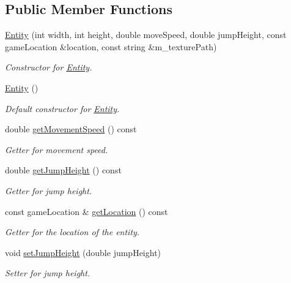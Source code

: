 \subsection*{Public Member Functions}
\begin{DoxyCompactItemize}
\item 
\hyperlink{classEntity_a0193c7a349273d65551c229ab1afabaf}{Entity} (int width, int height, double move\+Speed, double jump\+Height, const game\+Location \&location, const string \&m\+\_\+texture\+Path)
\begin{DoxyCompactList}\small\item\em Constructor for \hyperlink{classEntity}{Entity}. \end{DoxyCompactList}\item 
\mbox{\label{classEntity_a980f368aa07ce358583982821533a54a}} 
\hyperlink{classEntity_a980f368aa07ce358583982821533a54a}{Entity} ()
\begin{DoxyCompactList}\small\item\em Default constructor for \hyperlink{classEntity}{Entity}. \end{DoxyCompactList}\item 
double \hyperlink{classEntity_ae702b415329b0c3f382747f0a6668115}{get\+Movement\+Speed} () const
\begin{DoxyCompactList}\small\item\em Getter for movement speed. \end{DoxyCompactList}\item 
double \hyperlink{classEntity_a4f950165af1db516a081d1085c21032e}{get\+Jump\+Height} () const
\begin{DoxyCompactList}\small\item\em Getter for jump height. \end{DoxyCompactList}\item 
const game\+Location \& \hyperlink{classEntity_a1096aa490b52f061d947b2cc3831266e}{get\+Location} () const
\begin{DoxyCompactList}\small\item\em Getter for the location of the entity. \end{DoxyCompactList}\item 
void \hyperlink{classEntity_ab6ccff5da8e3cdc67659b0e89158c199}{set\+Jump\+Height} (double jump\+Height)
\begin{DoxyCompactList}\small\item\em Setter for jump height. \end{DoxyCompactList}\item 

\end{DoxyCompactItemize}
